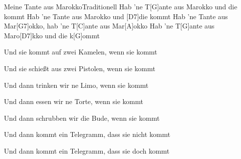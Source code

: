 \documentclass[../main.tex]{subfiles}
\begin{document}
\begin{song}{Meine Tante aus Marokko}{Traditionell}{}
Hab 'ne T[G]ante aus Marokko und die kommt \hh{}
Hab 'ne Tante aus Marokko und [D7]die kommt \hh{}
Hab 'ne Tante aus Mar[G7]okko, hab 'ne T[C]ante aus Mar[A]okko
Hab 'ne T[G]ante aus Maro[D7]kko und die k[G]ommt \hh{}


Und sie kommt auf zwei Kamelen, wenn sie kommt \hh{}


Und sie schießt aus zwei Pistolen, wenn sie kommt \hh{}


Und dann trinken wir ne Limo, wenn sie kommt \hh{}


Und dann essen wir ne Torte, wenn sie kommt \hh{}


Und dann schrubben wir die Bude, wenn sie kommt \hh{}


Und dann kommt ein Telegramm, dass sie nicht kommt \hh{}


Und dann kommt ein Telegramm, dass sie doch kommt \hh{}
\end{song}
\end{document}
